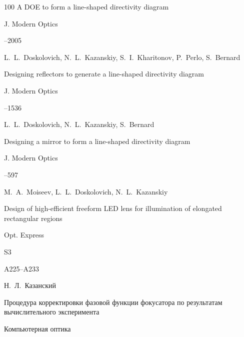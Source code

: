 \begin{thebibliography}{100}
\paper A DOE to form a line-shaped directivity diagram

\jour J. Modern Optics




--2005




\by  L.~L.~Doskolovich, N.~L.~Kazanskiy, S.~I.~Kharitonov, P.~Perlo, S.~Bernard

\paper Designing reflectors to generate a line-shaped directivity diagram

\jour  J. Modern Optics




--1536




\by  L.~L.~Doskolovich, N.~L.~Kazanskiy, S.~Bernard

\paper Designing a mirror to form a line-shaped directivity diagram

\jour J. Modern Optics




--597




\by  M.~A.~Moiseev, L.~L.~Doskolovich, N.~L.~Kazanskiy

\paper Design of high-efficient freeform LED lens for illumination of elongated rectangular regions

\jour Opt. Express



\issue S3

\pages A225--A233




\by Н.~Л.~Казанский

\paper Процедура корректировки фазовой функции фокусатора по результатам вычислительного эксперимента

\jour Компьютерная оптика




\end{thebibliography}
